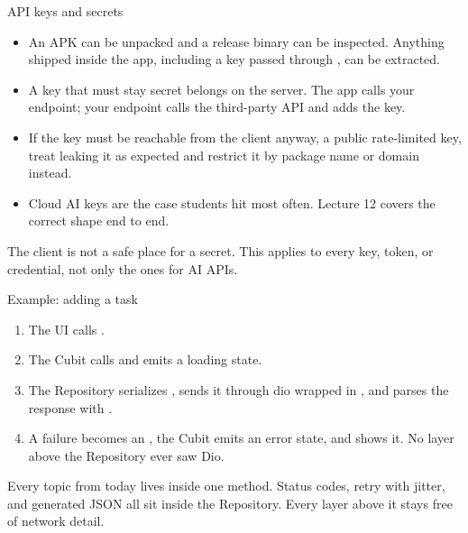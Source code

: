 \documentclass[10pt,aspectratio=169,t]{beamer}
\begin{document}
\begin{frame}[eyebrow=Architecture]{API keys and secrets}
  \begin{itemize}
    \item An APK can be unpacked and a release binary can be inspected. Anything shipped inside the app, including a key passed through , can be extracted.
    \item A key that must stay secret belongs on the server. The app calls your endpoint; your endpoint calls the third-party API and adds the key.
    \item If the key must be reachable from the client anyway, a public rate-limited key, treat leaking it as expected and restrict it by package name or domain instead.
    \item Cloud AI keys are the case students hit most often. Lecture 12 covers the correct shape end to end.
  \end{itemize}
  \vskip 2mm
  \begin{takeaway}{The client is not a safe place for a secret.}
    This applies to every key, token, or credential, not only the ones for AI APIs.
  \end{takeaway}
\end{frame}

\begin{frame}[eyebrow=Architecture]{Example: adding a task}
  \begin{enumerate}
    \item The UI calls .
    \item The Cubit calls  and emits a loading state.
    \item The Repository serializes , sends it through dio wrapped in , and parses the response with .
    \item A failure becomes an , the Cubit emits an error state, and  shows it. No layer above the Repository ever saw Dio.
  \end{enumerate}
  \begin{takeaway}{Every topic from today lives inside one method.}
    Status codes, retry with jitter, and generated JSON all sit inside the Repository. Every layer above it stays free of network detail.
  \end{takeaway}
\end{frame}
\end{document}
